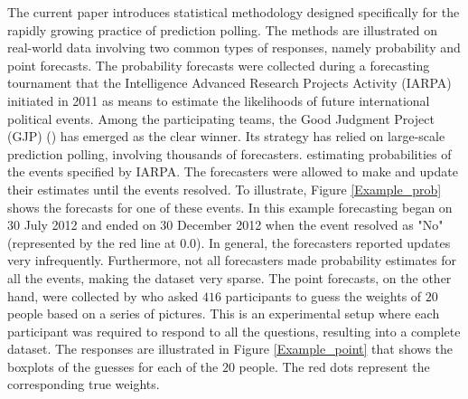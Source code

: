 \documentclass[11pt]{article}
\theoremstyle{definition}
\theoremstyle{definition}
\begin{document}
The current paper introduces statistical methodology designed specifically for the rapidly growing practice of prediction polling. The methods are illustrated on real-world data involving two common types of responses, namely probability and point forecasts. The probability forecasts were collected during a forecasting tournament that the Intelligence Advanced Research Projects Activity (IARPA) initiated in 2011 as means to estimate the likelihoods of future international political events. Among the participating teams, the Good Judgment Project (GJP) (\citealt{ungar2012good, mellers2014psychological}) has emerged as the clear winner. 
Its strategy has relied on large-scale prediction polling, involving 
thousands of forecasters.
estimating probabilities of the events specified by IARPA. The forecasters were allowed to make and update their estimates until the events resolved. To illustrate, Figure \ref{Example_prob} shows the forecasts for one of these events. In this example forecasting began on 30 July 2012 and ended on 30 December 2012 when the event resolved as "No" (represented by the red line at $0.0$). 
In general, the forecasters reported updates very infrequently. Furthermore, not all forecasters made probability estimates for all the events, making the dataset very sparse. The point forecasts, on the other hand, were collected by \cite{moore2008use} who asked $416$ participants to guess the weights of $20$ people based on a series of pictures. This is an experimental setup where each participant was required to respond to all the questions, resulting into a complete dataset. The responses are illustrated in Figure \ref{Example_point} that shows the boxplots of the guesses for each of the $20$ people. The red dots represent the corresponding true weights.

\end{document}
